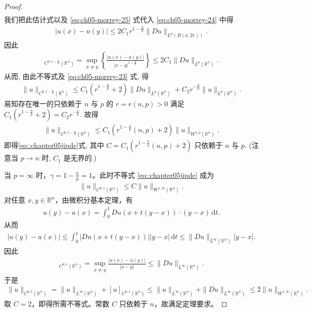 \documentclass[../../main.tex]{subfiles}
\begin{document}
\begin{proof}
\begin{align*}
\end{align*}
我们把此估计式以及 \eqref{eq:ch05-morrey-25} 式代入 \eqref{eq:ch05-morrey-24} 中得
\begin{align}\label{eq::jiwj333j33333}
|u(x)-u(y)| \leqslant 2C_1 r^{1-\frac{n}{p}} \|Du\|_{L^p(B(x,2r))}.
\end{align}
因此
\begin{align*}
[u]_{C^{0,1-\frac{n}{p}}(\mathbb{R}^n)} = \sup\limits_{x\neq y} \left\{ \frac{|u(x)-u(y)|}{|x-y|^{1-\frac{n}{p}}} \right\} \leqslant 2C_1 \|Du\|_{L^p(\mathbb{R}^n)}.
\end{align*}
从而, 由此不等式及 \eqref{eq:ch05-morrey-23} 式, 得
\begin{align*}
\|u\|_{C^{0,1-\frac{n}{p}}(\mathbb{R}^n)} \leqslant C_1 (r^{1-\frac{n}{p}}+2) \|Du\|_{L^p(\mathbb{R}^n)} + C_2 r^{-\frac{n}{p}} \|u\|_{L^p(\mathbb{R}^n)}.
\end{align*}
易知存在唯一的只依赖于 $n$ 与 $p$ 的 $r=r(n,p)>0$ 满足 $C_1 (r^{1-\frac{n}{p}}+2) = C_2 r^{-\frac{n}{p}}$. 故得
\begin{align*}
\|u\|_{C^{0,1-\frac{n}{p}}(\mathbb{R}^n)} \leqslant C_1 (r^{1-\frac{n}{p}}(n,p)+2) \|u\|_{W^{1,p}(\mathbb{R}^n)}.
\end{align*}
即得\eqref{eq::chapter05jipde}式, 其中 $C = C_1 (r^{1-\frac{n}{p}}(n,p)+2)$ 只依赖于 $n$ 与 $p$. (注意当 $p\to n$ 时, $C_1$ 是无界的.)

当 $p = \infty$ 时，$\gamma = 1 - \frac{n}{p} = 1$。此时不等式 \eqref{eq::chapter05jipde} 成为
\begin{align*}
\|u\|_{C^{0,1}(\mathbb{R}^n)} \leqslant C \|u\|_{W^{1,\infty}(\mathbb{R}^n)}.
\end{align*}
对任意 $x, y \in \mathbb{R}^n$，由微积分基本定理，有
\begin{align*}
u(y) - u(x) = \int_0^1 Du(x + t(y - x)) \cdot (y - x) \,\mathrm{d}t.
\end{align*}
从而
\begin{align*}
|u(y) - u(x)| \leqslant \int_0^1 |Du(x + t(y - x))| |y - x| \,\mathrm{d}t \leqslant \|Du\|_{L^\infty(\mathbb{R}^n)} |y - x|.
\end{align*}
因此
\begin{align*}
[u]_{C^{0,1}(\mathbb{R}^n)} = \sup_{x \neq y} \frac{|u(x) - u(y)|}{|x - y|} \leqslant \|Du\|_{L^\infty(\mathbb{R}^n)}.
\end{align*}
于是
\begin{align*}
\|u\|_{C^{0,1}(\mathbb{R}^n)} = \|u\|_{L^\infty(\mathbb{R}^n)} + [u]_{C^{0,1}(\mathbb{R}^n)} \leqslant \|u\|_{L^\infty(\mathbb{R}^n)} + \|Du\|_{L^\infty(\mathbb{R}^n)} \leqslant 2 \|u\|_{W^{1,\infty}(\mathbb{R}^n)}.
\end{align*}
取 $C = 2$，即得所需不等式。常数 $C$ 只依赖于 $n$，故满足定理要求。
\end{proof}
\end{document}
